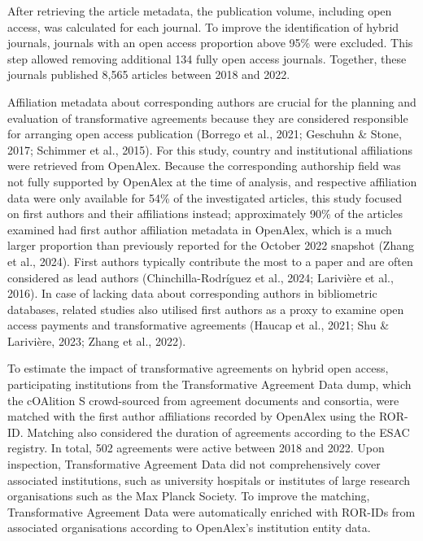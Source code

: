 \documentclass[a4paper,man,floatsintext,longtable,noextraspace,12pt]{apa6}
\begin{document}
After retrieving the article metadata, the publication volume, including
open access, was calculated for each journal. To improve the
identification of hybrid journals, journals with an open access
proportion above 95\% were excluded. This step allowed removing
additional 134 fully open access journals. Together, these journals
published 8,565 articles between 2018 and 2022.

Affiliation metadata about corresponding authors are crucial for the
planning and evaluation of transformative agreements because they are
considered responsible for arranging open access publication (Borrego et
al., 2021; Geschuhn \& Stone, 2017; Schimmer et al., 2015). For this
study, country and institutional affiliations were retrieved from
OpenAlex. Because the corresponding authorship field was not fully
supported by OpenAlex at the time of analysis, and respective
affiliation data were only available for 54\% of the investigated
articles, this study focused on first authors and their affiliations
instead; approximately 90\% of the articles examined had first author
affiliation metadata in OpenAlex, which is a much larger proportion than
previously reported for the October 2022 snapshot (Zhang et al., 2024).
First authors typically contribute the most to a paper and are often
considered as lead authors (Chinchilla-Rodríguez et al., 2024; Larivière
et al., 2016). In case of lacking data about corresponding authors in
bibliometric databases, related studies also utilised first authors as a
proxy to examine open access payments and transformative agreements
(Haucap et al., 2021; Shu \& Larivière, 2023; Zhang et al., 2022).

To estimate the impact of transformative agreements on hybrid open
access, participating institutions from the Transformative Agreement
Data dump, which the cOAlition S crowd-sourced from agreement documents
and consortia, were matched with the first author affiliations recorded
by OpenAlex using the ROR-ID. Matching also considered the duration of
agreements according to the ESAC registry. In total, 502 agreements were
active between 2018 and 2022. Upon inspection, Transformative Agreement
Data did not comprehensively cover associated institutions, such as
university hospitals or institutes of large research organisations such
as the Max Planck Society. To improve the matching, Transformative
Agreement Data were automatically enriched with ROR-IDs from associated
organisations according to OpenAlex's institution entity data.
\end{document}
